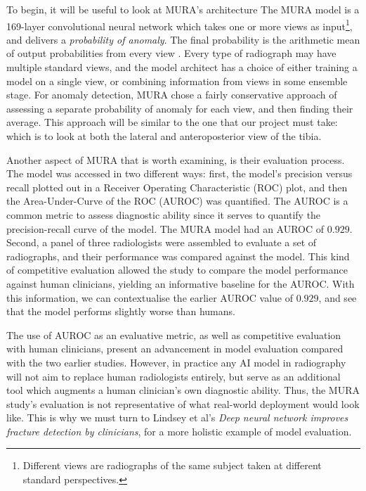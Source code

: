 To begin, it will be useful to look at MURA's architecture The MURA model is a 169-layer convolutional neural network which takes one or more views as input\footnote{Different views are radiographs of the same subject taken at different standard perspectives.}, and delivers a \emph{probability of anomaly}. The final probability is the arithmetic mean of output probabilities from every view \autocite{MURA2017}. Every type of radiograph may have multiple standard views, and the model architect has a choice of either training a model on a single view, or combining information from views in some ensemble stage. For anomaly detection, MURA chose a fairly conservative approach of assessing a separate probability of anomaly for each view, and then finding their average. This approach will be similar to the one that our project must take: which is to look at both the lateral and anteroposterior view of the tibia.

Another aspect of MURA that is worth examining, is their evaluation process. The model was accessed in two different ways: first, the model's precision versus recall plotted out in a Receiver Operating Characteristic (ROC) plot, and then the Area-Under-Curve of the ROC (AUROC) was quantified.  
\label{AUROC}
The AUROC is a common metric to assess diagnostic ability since it serves to quantify the precision-recall curve of the model. The MURA model had an AUROC of $0.929$. 
Second, a panel of three radiologists were assembled to evaluate a set of radiographs, and their performance was compared against the model. This kind of competitive evaluation allowed the study to compare the model performance against human clinicians, yielding an informative baseline for the AUROC.
With this information, we can contextualise the earlier AUROC value of $0.929$, and see that the model performs slightly worse than humans.

The use of AUROC as an evaluative metric, as well as competitive evaluation with human clinicians, present an advancement in model evaluation compared with the two earlier studies. However, in practice any AI model in radiography will not aim to replace human radiologists entirely, but serve as an additional tool which augments a human clinician's own diagnostic ability. Thus, the MURA study's evaluation is not representative of what real-world deployment would look like. This is why we must turn to Lindsey et al's \emph{Deep neural network improves fracture detection by clinicians}, for a more holistic example of model evaluation.

